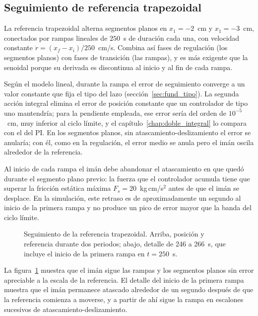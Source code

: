 \FloatBarrier

\subsection{Seguimiento de referencia trapezoidal}

La referencia trapezoidal alterna segmentos planos en $x_1 = -2$~cm y $x_1 = -3$~cm, conectados por rampas lineales de $250$~s de duración cada una, con velocidad constante $\dot{r} = (x_{f}-x_{i})/250$~cm/s. Combina así fases de regulación (los segmentos planos) con fases de transición (las rampas), y es más exigente que la senoidal porque su derivada es discontinua al inicio y al fin de cada rampa.

Según el modelo lineal, durante la rampa el error de seguimiento converge a un valor constante que fija el tipo del lazo (sección~\ref{sec:fund_tipo}). La segunda acción integral elimina el error de posición constante que un controlador de tipo uno mantendría; para la pendiente empleada, ese error sería del orden de $10^{-5}$~cm, muy inferior al ciclo límite, y el capítulo~\ref{chap:doble_integral} lo compara con el del PI. En los segmentos planos, sin atascamiento-deslizamiento el error se anularía; con él, como en la regulación, el error medio se anula pero el imán oscila alrededor de la referencia.

Al inicio de cada rampa el imán debe abandonar el atascamiento en que quedó durante el segmento plano previo: la fuerza que el controlador acumula tiene que superar la fricción estática máxima $F_s = 20$~kg\,cm/s$^2$ antes de que el imán se desplace. En la simulación, este retraso es de aproximadamente un segundo al inicio de la primera rampa y no produce un pico de error mayor que la banda del ciclo límite.

\begin{figure}[ht]
    \centering
    
    \caption[Seguimiento trapezoidal: posición]{Seguimiento de la referencia trapezoidal. Arriba, posición y referencia durante dos periodos; abajo, detalle de 246 a 266~s, que incluye el inicio de la primera rampa en $t=250$~s.}
    \label{fig:trap_pos}
\end{figure}

La figura~\ref{fig:trap_pos} muestra que el imán sigue las rampas y los segmentos planos sin error apreciable a la escala de la referencia. El detalle del inicio de la primera rampa muestra que el imán permanece atascado alrededor de un segundo después de que la referencia comienza a moverse, y a partir de ahí sigue la rampa en escalones sucesivos de atascamiento-deslizamiento.

